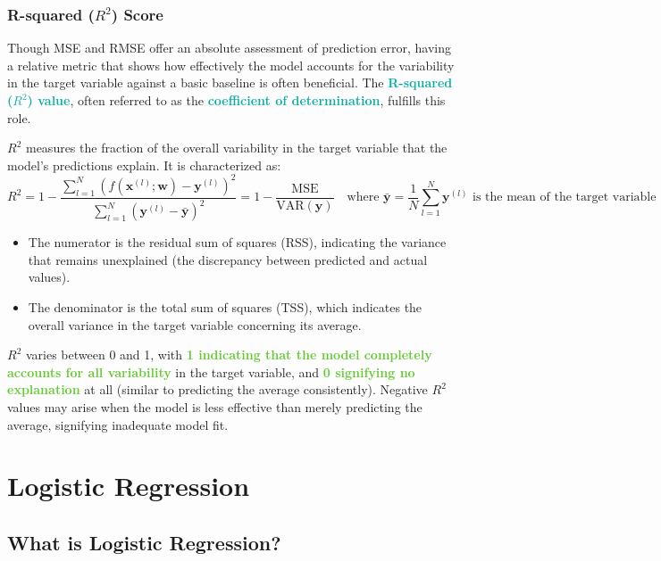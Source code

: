 \documentclass[twoside]{article}
\newcommand{\highlightbluetext}[1]{\textcolor[HTML]{09ACA6}{\textbf{#1}}}
\newcommand{\highlightgreentext}[1]{\textcolor[HTML]{62C92F}{\textbf{#1}}}
\numberwithin{equation}{section}
\begin{document}
	\subsubsection{R-squared ($R^2$) Score}
	\label{subsubsec:RSquaredScore}
	Though MSE and RMSE offer an absolute assessment of prediction error, having a relative metric that shows how effectively the model accounts for the variability in the target variable against a basic baseline is often beneficial. The \highlightbluetext{R-squared ($R^2$) value}, often referred to as the \highlightbluetext{coefficient of determination}, fulfills this role.

	$R^2$ measures the fraction of the overall variability in the target variable that the model's predictions explain. It is characterized as:
	\begin{equation}
	\label{eq:RSquaredScoreDefinition}
		\boxed{R^2 = 1 - \frac{\sum_{l = 1}^{N} \left( f(\mathbf{x}^{(l)}; \mathbf{w}) - \mathbf{y}^{(l)} \right)^2}{\sum_{l = 1}^{N} \left( \mathbf{y}^{(l)} - \bar{\mathbf{y}} \right)^2} = 1 - \frac{\text{MSE}}{\text{VAR}(\mathbf{y})}} \quad \text{where } \bar{\mathbf{y}} = \frac{1}{N} \sum_{l = 1}^{N} \mathbf{y}^{(l)} \text{ is the mean of the target variable}
	\end{equation}
	\begin{itemize}
		\item The numerator is the residual sum of squares (RSS), indicating the variance that remains unexplained (the discrepancy between predicted and actual values).
		\item The denominator is the total sum of squares (TSS), which indicates the overall variance in the target variable concerning its average.
	\end{itemize}
	$R^2$ varies between 0 and 1, with \highlightgreentext{1 indicating that the model completely accounts for all variability} in the target variable, and \highlightgreentext{0 signifying no explanation} at all (similar to predicting the average consistently). Negative $R^2$ values may arise when the model is less effective than merely predicting the average, signifying inadequate model fit.

	\newpage
	\section{Logistic Regression}
	\label{sec:LogisticRegression}

	\subsection{What is Logistic Regression?}
	\label{subsec:WhatIsLogisticRegression}
\end{document}
